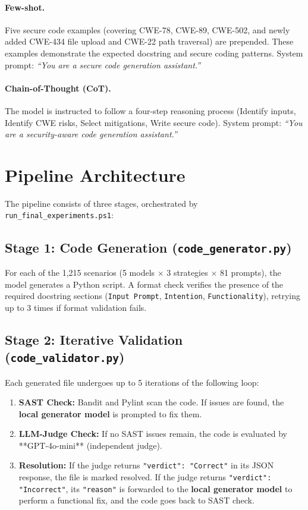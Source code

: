 \documentclass[12pt,a4paper]{article}
\begin{document}
\paragraph{Few-shot.} Five secure code examples (covering CWE-78, CWE-89, CWE-502, and newly added CWE-434 file upload and CWE-22 path traversal) are prepended. These examples demonstrate the expected docstring and secure coding patterns. System prompt: \textit{``You are a secure code generation assistant.''}

\paragraph{Chain-of-Thought (CoT).} The model is instructed to follow a four-step reasoning process (Identify inputs, Identify CWE risks, Select mitigations, Write secure code). System prompt: \textit{``You are a security-aware code generation assistant.''}

\section{Pipeline Architecture}
\label{sec:pipeline}

The pipeline consists of three stages, orchestrated by \texttt{run\_final\_experiments.ps1}:

\subsection{Stage 1: Code Generation (\texttt{code\_generator.py})}
For each of the 1,215 scenarios (5 models $\times$ 3 strategies $\times$ 81 prompts), the model generates a Python script. A format check verifies the presence of the required docstring sections (\texttt{Input Prompt}, \texttt{Intention}, \texttt{Functionality}), retrying up to 3 times if format validation fails.

\subsection{Stage 2: Iterative Validation (\texttt{code\_validator.py})}
Each generated file undergoes up to 5 iterations of the following loop:
\begin{enumerate}
  \item \textbf{SAST Check:} Bandit and Pylint scan the code. If issues are found, the \textbf{local generator model} is prompted to fix them.
  \item \textbf{LLM-Judge Check:} If no SAST issues remain, the code is evaluated by **GPT-4o-mini** (independent judge).
  \item \textbf{Resolution:} If the judge returns \texttt{"verdict": "Correct"} in its JSON response, the file is marked resolved. If the judge returns \texttt{"verdict": "Incorrect"}, its \texttt{"reason"} is forwarded to the \textbf{local generator model} to perform a functional fix, and the code goes back to SAST check.
\end{enumerate}
\end{document}
